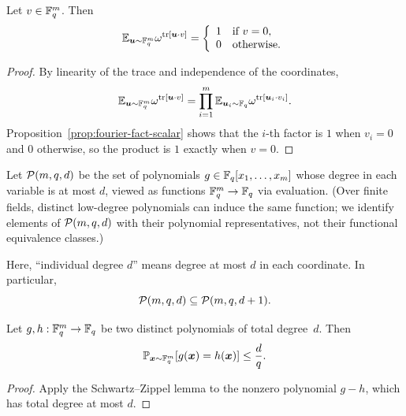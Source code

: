 \begin{lemma}\label{prop:fourier-fact-vector}
	\leanok
	Let $v \in \mathbb{F}_q^m$. Then
	\begin{equation*}
		\mathbb{E}_{\boldsymbol{u} \sim \mathbb{F}_q^m} \omega^{\operatorname{tr}[\boldsymbol{u} \cdot v]}
		= \left\{\begin{array}{rl}
			1 & \text{if $v = 0$}, \\
			0 & \text{otherwise}.
		\end{array}\right.
	\end{equation*}
\end{lemma}
\begin{proof}
	\leanok
	By linearity of the trace and independence of the coordinates,
	\[
		\mathbb{E}_{\boldsymbol{u} \sim \mathbb{F}_q^m} \omega^{\operatorname{tr}[\boldsymbol{u} \cdot v]}
		= \prod_{i=1}^m \mathbb{E}_{\boldsymbol{u}_i \sim \mathbb{F}_q} \omega^{\operatorname{tr}[\boldsymbol{u}_i \cdot v_i]}.
	\]
	Proposition~\ref{prop:fourier-fact-scalar} shows that the $i$-th factor is $1$ when $v_i=0$ and $0$ otherwise, so the product is $1$ exactly when $v=0$.
\end{proof}

\begin{definition}\label{def:polyfunc}
	\leanok
	Let $\mathcal{P}(m,q,d)$ be the set of polynomials $g \in \mathbb{F}_q[x_1,\dots,x_m]$ whose degree in each variable is at most $d$, viewed as functions $\mathbb{F}_q^m \to \mathbb{F}_q$ via evaluation. (Over finite fields, distinct low-degree polynomials can induce the same function; we identify elements of $\mathcal{P}(m,q,d)$ with their polynomial representatives, not their functional equivalence classes.)
\end{definition}

\begin{remark}\label{rem:individual-degree-convention}
	Here, ``individual degree $d$'' means degree at most $d$ in each coordinate. In
	particular,
	\[
		\mathcal{P}(m,q,d) \subseteq \mathcal{P}(m,q,d+1).
	\]
\end{remark}

\begin{lemma}\label{lem:schwartz-zippel-total-degree}
	\leanok
	Let $g, h:\mathbb{F}_q^m \rightarrow \mathbb{F}_q$ be two distinct polynomials of total degree~$d$.
	Then
	\begin{equation*}
		\mathbb{P}_{{\boldsymbol{x}} \sim \mathbb{F}_q^m}[g({\boldsymbol{x}}) = h({\boldsymbol{x}})] \leq \frac{d}{q}.
	\end{equation*}
\end{lemma}
\begin{proof}
	\leanok
	Apply the Schwartz--Zippel lemma to the nonzero polynomial $g-h$, which has total degree at most $d$.
\end{proof}

